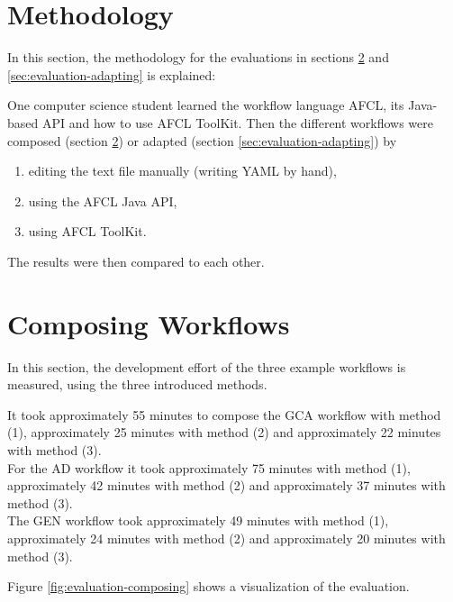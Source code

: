 \documentclass[a4paper,top=25mm,bottom=25mm,12pt,pdftex,halfparskip,twoside,bibtotoc,numbers=noenddot]{scrbook}
\begin{document}
\section{Methodology}

In this section, the methodology for the evaluations in sections \ref{sec:evaluation-composing} and \ref{sec:evaluation-adapting} is explained:

One computer science student learned the workflow language AFCL, its Java-based API and how to use AFCL ToolKit.
Then the different workflows were composed (section \ref{sec:evaluation-composing}) or adapted (section \ref{sec:evaluation-adapting}) by
\begin{enumerate}[label={(\arabic*)}]
	\item editing the text file manually (writing YAML by hand),
	\item using the AFCL Java API,
	\item using AFCL ToolKit.
\end{enumerate}

The results were then compared to each other.

\section{Composing Workflows}
\label{sec:evaluation-composing}

In this section, the development effort of the three example workflows is measured, using the three introduced methods.

It took approximately 55 minutes to compose the GCA workflow with method (1), approximately 25 minutes with method (2) and approximately 22 minutes with method (3).\\
For the AD workflow it took approximately 75 minutes with method (1), approximately 42 minutes with method (2) and approximately 37 minutes with method (3).\\
The GEN workflow took approximately 49 minutes with method (1), approximately 24 minutes with method (2) and approximately 20 minutes with method (3).

Figure \ref{fig:evaluation-composing} shows a visualization of the evaluation.
\end{document}
